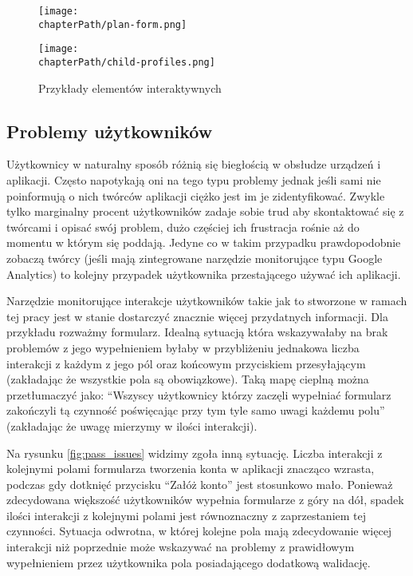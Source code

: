 \bigskip
\begin{figure}[H]
\centering
\begin{minipage}{.3\textwidth}
	\centering
	\texttt{[image: \\chapterPath/plan-form.png]}
\end{minipage}
\begin{minipage}{.4\textwidth}
	\centering
	\texttt{[image: \\chapterPath/child-profiles.png]}
\end{minipage}
\bigskip
\caption{Przykłady elementów interaktywnych}
\label{fig:interactive_areas}
\end{figure}

\subsection{Problemy użytkowników}
Użytkownicy w naturalny sposób różnią się biegłością w obsłudze urządzeń i aplikacji. Często napotykają oni na tego typu problemy jednak jeśli sami nie poinformują o nich twórców aplikacji ciężko jest im je zidentyfikować. Zwykle tylko marginalny procent użytkowników zadaje sobie trud aby skontaktować się z twórcami i opisać swój problem, dużo częściej ich frustracja rośnie aż do momentu w którym się poddają. Jedyne co w takim przypadku prawdopodobnie zobaczą twórcy (jeśli mają zintegrowane narzędzie monitorujące typu Google Analytics) to kolejny przypadek użytkownika przestającego używać ich aplikacji. 

Narzędzie monitorujące interakcje użytkowników takie jak to stworzone w ramach tej pracy jest w stanie dostarczyć znacznie więcej przydatnych informacji. Dla przykładu rozważmy formularz. Idealną sytuacją która wskazywałaby na brak problemów z jego wypełnieniem byłaby w przybliżeniu jednakowa liczba interakcji z każdym z jego pól oraz końcowym przyciskiem przesyłającym (zakładając że wszystkie pola są obowiązkowe). Taką mapę cieplną można przetłumaczyć jako: ``Wszyscy użytkownicy którzy zaczęli wypełniać formularz zakończyli tą czynność poświęcając przy tym tyle samo uwagi każdemu polu'' (zakładając że uwagę mierzymy w ilości interakcji). 

Na rysunku \ref{fig:pass_issues} widzimy zgoła inną sytuację. Liczba interakcji z kolejnymi polami formularza tworzenia konta w aplikacji znacząco wzrasta, podczas gdy dotknięć przycisku ``Załóż konto'' jest stosunkowo mało. Ponieważ zdecydowana większość użytkowników wypełnia formularze z góry na dół, spadek ilości interakcji z kolejnymi polami jest równoznaczny z zaprzestaniem tej czynności. Sytuacja odwrotna, w której kolejne pola mają zdecydowanie więcej interakcji niż poprzednie może wskazywać na problemy z prawidłowym wypełnieniem przez użytkownika pola posiadającego dodatkową walidację. 

